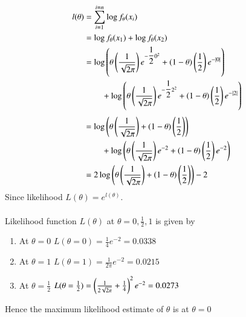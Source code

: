 \documentclass[journal,12pt,twocolumn]{IEEEtran}
\begin{document}
\begin{align}
l(\theta) &= \sum_{i=1}^{i=n} \log f_{\theta}(x_{i})\\
&= \log f_{\theta}(x_{1}) + \log f_{\theta}(x_{2}) \\
&=\log\left(\theta\left(\dfrac{1}{\sqrt{2\pi}}\right)e^{-\dfrac{1}{2}0^{2}}+\left(1-\theta\right)\left(\dfrac{1}{2}\right)e^{-\mid 0\mid}\right) \nonumber\\&\hspace{0.75cm}+\log\left(\theta\left(\dfrac{1}{\sqrt{2\pi}}\right) e^{-\dfrac{1}{2}2^{2}}+\left(1-\theta\right)\left(\dfrac{1}{2}\right)e^{-\mid 2\mid}\right)
\end{align}
\begin{align}
&=\log\left(\theta\left(\dfrac{1}{\sqrt{2\pi}}\right)+(1-\theta)\left(\dfrac{1}{2}\right)\right)\nonumber\\&\hspace{0.75cm}+\log\left(\theta\left(\dfrac{1}{\sqrt{2\pi}}\right) e^{-2}+\left(1-\theta\right)\left(\dfrac{1}{2}\right)e^{-2}\right)\\
&=2\log\left(\theta\left(\dfrac{1}{\sqrt{2\pi}}\right)+\left(1-\theta\right)\left(\dfrac{1}{2}\right)\right) -2
\end{align}
Since likelihood $L(\theta) = e^{l(\theta)}$.\\ \\
Likelihood function $L(\theta)$  at $\theta = 0, \frac{1}{2}, 1$ is given by
\begin{enumerate}
    \item At $\theta=0$ \hspace{0.5cm} $L(\theta=0)=\frac{1}{4}e^{-2}=0.0338$\\
    \item At $\theta=1$ \hspace{0.5cm} $L(\theta=1)=\frac{1}{2\pi}e^{-2}=0.0215$\\
    \item At $\theta=\frac{1}{2}$ \hspace{0.2cm}
    $L(\theta=\frac{1}{2})=\left(\frac{1}{2\sqrt{2\pi}}+\frac{1}{4}\right)^{2}e^{-2}=0.0273$
\end{enumerate}
Hence the maximum likelihood estimate of $\theta$ is at $\theta=0$
\end{document}
